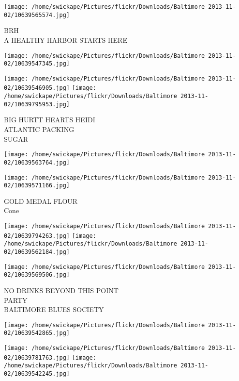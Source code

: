 \documentclass[10pt,letterpaper]{article}
\begin{document}
\vspace{0.25in}
\texttt{[image: /home/swickape/Pictures/flickr/Downloads/Baltimore 2013-11-02/10639565574.jpg]}

BRH\\
A HEALTHY HARBOR STARTS HERE\\
\pagebreak

\texttt{[image: /home/swickape/Pictures/flickr/Downloads/Baltimore 2013-11-02/10639547345.jpg]}

\vspace{0.25in}
\texttt{[image: /home/swickape/Pictures/flickr/Downloads/Baltimore 2013-11-02/10639546905.jpg]}
\texttt{[image: /home/swickape/Pictures/flickr/Downloads/Baltimore 2013-11-02/10639795953.jpg]}

BIG HURTT HEARTS HEIDI\\
ATLANTIC PACKING\\
SUGAR\\
\pagebreak

\texttt{[image: /home/swickape/Pictures/flickr/Downloads/Baltimore 2013-11-02/10639563764.jpg]}

\vspace{0.25in}
\texttt{[image: /home/swickape/Pictures/flickr/Downloads/Baltimore 2013-11-02/10639571166.jpg]}

GOLD MEDAL FLOUR\\
Cone\\
\pagebreak

\texttt{[image: /home/swickape/Pictures/flickr/Downloads/Baltimore 2013-11-02/10639794263.jpg]}
\texttt{[image: /home/swickape/Pictures/flickr/Downloads/Baltimore 2013-11-02/10639562184.jpg]}

\texttt{[image: /home/swickape/Pictures/flickr/Downloads/Baltimore 2013-11-02/10639569506.jpg]}

NO DRINKS BEYOND THIS POINT\\
PARTY\\
BALTIMORE BLUES SOCIETY\\
\pagebreak

\texttt{[image: /home/swickape/Pictures/flickr/Downloads/Baltimore 2013-11-02/10639542865.jpg]}

\vspace{0.25in}
\texttt{[image: /home/swickape/Pictures/flickr/Downloads/Baltimore 2013-11-02/10639781763.jpg]}
\texttt{[image: /home/swickape/Pictures/flickr/Downloads/Baltimore 2013-11-02/10639542245.jpg]}
\end{document}
